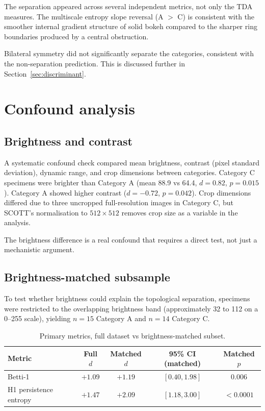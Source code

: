 \documentclass[11pt,a4paper]{article}
\begin{document}
The separation appeared across several independent metrics, not only the TDA measures. The multiscale entropy slope reversal (A $>$ C) is consistent with the smoother internal gradient structure of solid bokeh compared to the sharper ring boundaries produced by a central obstruction.

Bilateral symmetry did not significantly separate the categories, consistent with the non-separation prediction. This is discussed further in Section~\ref{sec:discriminant}.

\section{Confound analysis}

\subsection{Brightness and contrast}

A systematic confound check compared mean brightness, contrast (pixel standard deviation), dynamic range, and crop dimensions between categories. Category C specimens were brighter than Category A (mean 88.9 vs 64.4, $d=0.82$, $p=0.015$). Category A showed higher contrast ($d=-0.72$, $p=0.042$). Crop dimensions differed due to three uncropped full-resolution images in Category C, but SCOTT's normalisation to $512 \times 512$ removes crop size as a variable in the analysis.

The brightness difference is a real confound that requires a direct test, not just a mechanistic argument.

\subsection{Brightness-matched subsample}

To test whether brightness could explain the topological separation, specimens were restricted to the overlapping brightness band (approximately 32 to 112 on a 0--255 scale), yielding $n=15$ Category A and $n=14$ Category C.

\begin{table}[h]
\centering
\caption{Primary metrics, full dataset vs brightness-matched subset.}
\begin{tabular}{lcccc}
\toprule
Metric & Full $d$ & Matched $d$ & 95\% CI (matched) & Matched $p$ \\
\midrule
Betti-1 & $+1.09$ & $+1.19$ & $[0.40, 1.98]$ & 0.006 \\
H1 persistence entropy & $+1.47$ & $+2.09$ & $[1.18, 3.00]$ & $<0.0001$ \\
\bottomrule
\end{tabular}
\end{table}
\end{document}
